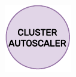 \begin{figure}
  \centering
  \includegraphics[width=\linewidth]{images/architecture/cluster_autoscaler.pdf}
\end{figure}


